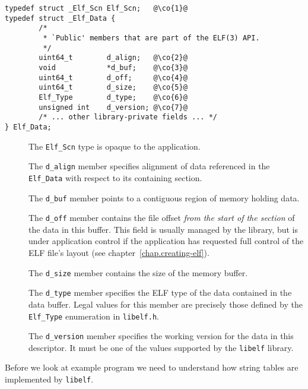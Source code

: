 \documentclass[a4paper]{book}
\makeatletter
\newcommand{\filename}[1]{\texttt{#1}}
\newcommand{\library}[1]{\texttt{#1}}
\newcommand{\parameter}[1]{\texttt{#1}}
\newcommand{\type}[1]{\texttt{#1}}
\newenvironment{callout}[2][blue]{%
  \begingroup\newcommand{\@cocolor}{#1}%
  \newcommand{\@cogroup}[1]{#2}}{\endgroup}
\newcommand{\@co}[1]{\framebox{\textbf{\color{\@cocolor}#1}}}
\newcommand{\co}[1]{%
  \hypertarget{\@cogroup.#1.co}{%
    \hyperlink{\@cogroup.#1.cr}{\@co{#1}}}}
\newcommand{\coref}[1]{%
  \hypertarget{\@cogroup.#1.cr}{%
    \hyperlink{\@cogroup.#1.co}{\@co{#1}}}}
\makeatother
\begin{document}
\begin{callout}{data}
  \begin{lstlisting}[caption=Definition of Elf\_Data and Elf\_Scn,
      label=fig.elf.scn-data.decl, basicstyle=\small\ttfamily]
typedef struct _Elf_Scn Elf_Scn;   @\co{1}@ 
typedef struct _Elf_Data {
        /*
         * `Public' members that are part of the ELF(3) API.
         */
        uint64_t        d_align;   @\co{2}@
        void            *d_buf;    @\co{3}@
        uint64_t        d_off;     @\co{4}@
        uint64_t        d_size;    @\co{5}@
        Elf_Type        d_type;    @\co{6}@
        unsigned int    d_version; @\co{7}@
        /* ... other library-private fields ... */
} Elf_Data;
  \end{lstlisting}

  \begin{description}
  \item[\coref{1}] The \type{Elf\_Scn} type is opaque to the
    application.
  \item[\coref{2}] The \parameter{d\_align} member specifies alignment
    of data referenced in the \type{Elf\_Data} with respect to its
    containing section.
  \item[\coref{3}] The \parameter{d\_buf} member points to a contiguous
    region of memory holding data.
  \item[\coref{4}] The \parameter{d\_off} member contains the file
    offset \emph{from the start of the section} of the data in this
    buffer.  This field is usually managed by the library, but is
    under application control if the application has requested full
    control of the ELF file's layout (see
    chapter~\vref{chap.creating-elf}).
  \item[\coref{5}] The \parameter{d\_size} member contains the size of
    the memory buffer.
  \item[\coref{6}] The \parameter{d\_type} member specifies the ELF
    type of the data contained in the data buffer.  Legal values for
    this member are precisely those defined by the \type{Elf\_Type}
    enumeration in \filename{libelf.h}.
  \item[\coref{7}] The \parameter{d\_version} member specifies the
    working version for the data in this descriptor.  It must be one
    of the values supported by the \library{libelf} library.
  \end{description}
\end{callout}

Before we look at example program we need to understand how string
tables are implemented by \library{libelf}.
\end{document}
